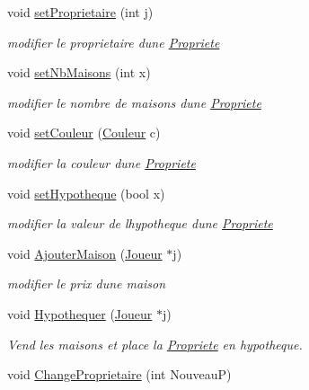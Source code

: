 \begin{DoxyCompactItemize}
void \hyperlink{classPropriete_a622ae8f8fbb32d7918d81fa0bc3d8a4e}{set\+Proprietaire} (int j)
\begin{DoxyCompactList}\small\item\em modifier le proprietaire d\textquotesingle{}une \hyperlink{classPropriete}{Propriete} \end{DoxyCompactList}\item 
void \hyperlink{classPropriete_ae947a56ea6c4692e42d0cf8314ccfc62}{set\+Nb\+Maisons} (int x)
\begin{DoxyCompactList}\small\item\em modifier le nombre de maisons d\textquotesingle{}une \hyperlink{classPropriete}{Propriete} \end{DoxyCompactList}\item 
void \hyperlink{classPropriete_a49777433231ed442b660d4af803c01dc}{set\+Couleur} (\hyperlink{classCouleur}{Couleur} c)
\begin{DoxyCompactList}\small\item\em modifier la couleur d\textquotesingle{}une \hyperlink{classPropriete}{Propriete} \end{DoxyCompactList}\item 
void \hyperlink{classPropriete_a68750bee273997b846947afde0021165}{set\+Hypotheque} (bool x)
\begin{DoxyCompactList}\small\item\em modifier la valeur de l\textquotesingle{}hypotheque d\textquotesingle{}une \hyperlink{classPropriete}{Propriete} \end{DoxyCompactList}\item 
void \hyperlink{classPropriete_a265e57e36532f40e69b78566c307e144}{Ajouter\+Maison} (\hyperlink{classJoueur}{Joueur} $\ast$j)
\begin{DoxyCompactList}\small\item\em modifier le prix d\textquotesingle{}une maison \end{DoxyCompactList}\item 
void \hyperlink{classPropriete_aa595e624672da66ea8de9742ab96eccd}{Hypothequer} (\hyperlink{classJoueur}{Joueur} $\ast$j)
\begin{DoxyCompactList}\small\item\em Vend les maisons et place la \hyperlink{classPropriete}{Propriete} en hypotheque. \end{DoxyCompactList}\item 
void \hyperlink{classPropriete_a4fc5e707a9ac2f947dd071198a49960c}{Change\+Proprietaire} (int NouveauP)

\end{DoxyCompactItemize}
